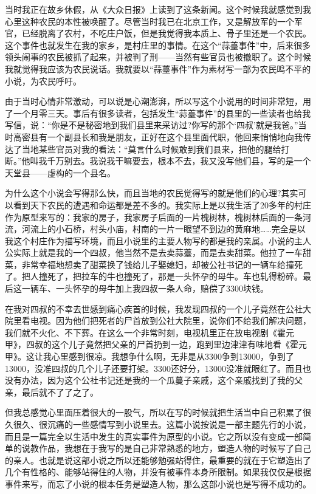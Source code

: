 \documentclass[fontset=fandol,12pt,a5paper]{ctexbook}
\begin{document}
当时我正在故乡休假，从《大众日报》上读到了这条新闻。这个时候我就感觉到我心里这种农民的本性被唤醒了。尽管当时我已在北京工作，又是解放军的一个军官，已经脱离了农村，不吃庄户饭，但是我觉得我本质上、骨子里还是一个农民。这个事件也就发生在我的家乡，是村庄里的事情。在这个“蒜薹事件”中，后来很多领头闹事的农民被抓了起来，并被判了刑——当然有些官员也被撤职了。这个时候我就觉得我应该为农民说话。我就要以“蒜薹事件”作为素材写一部为农民鸣不平的小说，为农民呼吁。

由于当时心情非常激动，可以说是心潮澎湃，所以写这个小说用的时间非常短，用了一个月零三天。事后有很多读者，包括发生“蒜薹事件”的县里的一些读者也给我写信，说：“你是不是秘密地到我们县里来采访过?你写的那个‘四叔’就是我爸。”当时高密县有一个副县长和我是朋友，正好在这个县里面代职，他回来悄悄地向我传达了当地某些官员对我的看法：“莫言什么时候敢到我们县来，把他的腿给打断。”他叫我千万别去。我说我干嘛要去，根本不去，我又没写他们县，写的是一个天堂县——虚构的一个县名。

为什么这个小说会写得那么快，而且当地的农民觉得写的就是他们的心理?其实可以看到天下农民的遭遇和命运都是差不多的。我实际上是以我生活了20多年的村庄作为原型来写的：我家的房子，我家房子后面的一片槐树林，槐树林后面的一条河流，河流上的小石桥，村头小庙，村南的一片一眼望不到边的黄麻地……完全是以我这个村庄作为描写环境，而且小说里的主要人物写的都是我的亲属。小说的主人公实际上就是我的一个四叔，他当然不是去卖蒜薹，而是去卖甜菜。他拉了一车甜菜，非常幸福地想卖了甜菜换了钱给儿子娶媳妇，却被公社书记的一辆车给撞死了。把人撞死了，把拉车的牛也撞死了，那是一头怀孕的母牛。车也轧得粉碎。最后这一辆车、一头怀孕的母牛加上我四叔一条人命，赔偿了3300块钱。

在我对四叔的不幸去世感到痛心疾首的时候，我发现四叔的一个儿子竟然在公社大院里看电视。因为他们把死者的尸首放到公社大院里，说你们不给我们解决问题，我们就不火化、不下葬。在这么一个非常时刻，电视机里正在放电视剧《霍元甲》，四叔的这个儿子竟然把父亲的尸首扔到一边，跑到里边津津有味地看《霍元甲》。这让我心里感到很凉。我想争什么啊，无非是从3300争到13000，争到了13000，没准四叔的几个儿子还要打架。3300还好分，13000没准就眼红了。而且也没有办法，因为这个公社书记还是我的一个瓜蔓子亲戚，这个亲戚找到了我的父亲，最后就不了了之了。

但我总感觉心里面压着很大的一股气，所以在写的时候就把生活当中自己积累了很久很久、很沉痛的一些感情写到小说里去。这篇小说按说是一部主题先行的小说，而且是一篇完全以生活中发生的真实事件为原型的小说。它之所以没有变成一部简单的说教作品，我想在于我写的是自己非常熟悉的地方，塑造人物的时候写了自己的亲人。也就是说这部小说之所以还能够勉强站得住，最重要的就在于它塑造出了几个有性格的、能够站得住的人物，并没有被事件本身所限制。如果我仅仅是根据事件来写，而忘了小说的根本任务是塑造人物，那么这部小说也是写得不成功的。
\end{document}
